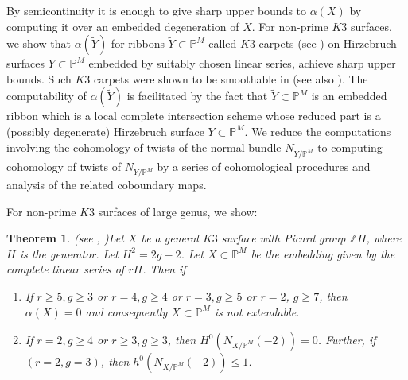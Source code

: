 \documentclass[11pt,twoside]{amsart}
\theoremstyle{plain}
\numberwithin{equation}{section}
\newtheorem{theorem}{Theorem}[section]
\theoremstyle{definition}
\begin{document}
By semicontinuity it is enough to give sharp upper bounds to $\alpha(X)$ by computing it over an embedded degeneration of $X$. For non-prime $K3$ surfaces, we show that $\alpha(\widetilde{Y})$ for ribbons $\widetilde{Y} \subset \mathbb{P}^M$ called $K3$ carpets (see ) on Hirzebruch surfaces $Y \subset \mathbb{P}^M$ embedded by suitably chosen linear series, achieve sharp upper bounds. Such $K3$ carpets were shown to be smoothable in \cite{BMR21} (see also \cite{GP97}). The computability of $\alpha(\widetilde{Y})$ is facilitated by the fact that $\widetilde{Y} \subset \mathbb{P}^M$ is an embedded ribbon which is a local complete intersection scheme whose reduced part is a (possibly degenerate) Hirzebruch surface $Y \subset \mathbb{P}^M$. %
We reduce the computations involving the cohomology of twists of the normal bundle $N_{\widetilde{Y}/\mathbb{P}^M}$ to computing cohomology of twists of $N_{Y/\mathbb{P}^M}$ by a series of cohomological procedures and analysis of the related coboundary maps. \par



For non-prime $K3$ surfaces of large genus, we show:

\begin{theorem}(see , )\label{non-extendability of K3 surfaces intro}
    Let $X$ be a general $K3$ surface with Picard group $\mathbb{Z}H$, where $H$ is the generator. Let $H^2 = 2g-2$. Let $X \subset \mathbb{P}^M$ be the embedding given by the complete linear series of $rH$. Then if
    \begin{enumerate}
        \item[(1)] If $r \geq 5, g \geq 3$ or $r = 4, g \geq 4$ or $r = 3, g \geq 5$ or $r = 2$, $g \geq 7$, then $\alpha(X) = 0$ and consequently $X \subset \mathbb{P}^M$ is not extendable. 
        
        \item[(2)] If $r = 2, g \geq 4$ or $r \geq 3, g \geq 3$, then $H^0(N_{X/\mathbb{P}^M}(-2)) = 0$. Further, if $(r = 2, g = 3)$, then $h^0(N_{X/\mathbb{P}^M}(-2)) \leq 1$.
        
        
    \end{enumerate}
\end{theorem}
\end{document}

